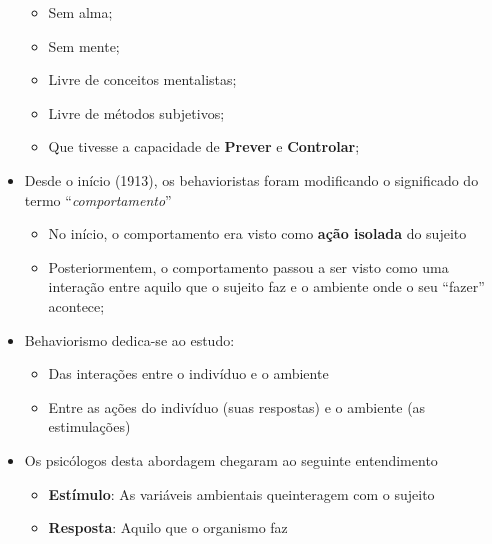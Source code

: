 \documentclass[
]{book}
\providecommand{\tightlist}{%
  \setlength{\itemsep}{0pt}\setlength{\parskip}{0pt}}
\begin{document}
\begin{itemize}
  \begin{itemize}
  \tightlist
  \item
    Sem alma;
  \item
    Sem mente;
  \item
    Livre de conceitos mentalistas;
  \item
    Livre de métodos subjetivos;
  \item
    Que tivesse a capacidade de \textbf{Prever} e \textbf{Controlar};
  \end{itemize}
\item
  Desde o início (1913), os behavioristas foram modificando o
  significado do termo ``\emph{comportamento}''

  \begin{itemize}
  \tightlist
  \item
    No início, o comportamento era visto como \textbf{ação isolada} do
    sujeito
  \item
    Posteriormentem, o comportamento passou a ser visto como uma
    interação entre aquilo que o sujeito faz e o ambiente onde o seu
    ``fazer'' acontece;
  \end{itemize}
\item
  Behaviorismo dedica-se ao estudo:

  \begin{itemize}
  \tightlist
  \item
    Das interações entre o indivíduo e o ambiente
  \item
    Entre as ações do indivíduo (suas respostas) e o ambiente (as
    estimulações)
  \end{itemize}
\item
  Os psicólogos desta abordagem chegaram ao seguinte entendimento

  \begin{itemize}
  \tightlist
  \item
    \textbf{Estímulo}: As variáveis ambientais queinteragem com o
    sujeito
  \item
    \textbf{Resposta}: Aquilo que o organismo faz
  \end{itemize}
\end{itemize}
\end{document}
